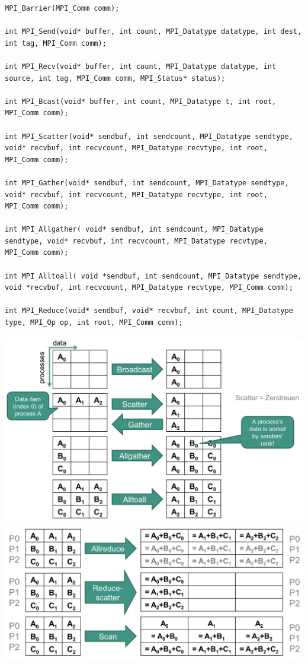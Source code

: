 \begin{verbatim}
MPI_Barrier(MPI_Comm comm);

int MPI_Send(void* buffer, int count, MPI_Datatype datatype, int dest, int tag, MPI_Comm comm);

int MPI_Recv(void* buffer, int count, MPI_Datatype datatype, int source, int tag, MPI_Comm comm, MPI_Status* status);

int MPI_Bcast(void* buffer, int count, MPI_Datatype t, int root, MPI_Comm comm);

int MPI_Scatter(void* sendbuf, int sendcount, MPI_Datatype sendtype, void* recvbuf, int recvcount, MPI_Datatype recvtype, int root, MPI_Comm comm);

int MPI_Gather(void* sendbuf, int sendcount, MPI_Datatype sendtype, void* recvbuf, int recvcount, MPI_Datatype recvtype, int root, MPI_Comm comm);

int MPI_Allgather( void* sendbuf, int sendcount, MPI_Datatype sendtype, void* recvbuf, int recvcount, MPI_Datatype recvtype, MPI_Comm comm);

int MPI_Alltoall( void *sendbuf, int sendcount, MPI_Datatype sendtype, void *recvbuf, int recvcount, MPI_Datatype recvtype, MPI_Comm comm);

int MPI_Reduce(void* sendbuf, void* recvbuf, int count, MPI_Datatype type, MPI_Op op, int root, MPI_Comm comm);
\end{verbatim}
\begin{center}
\includegraphics[width=\columnwidth]{images/MPI.png}
\includegraphics[width=\columnwidth]{images/MPI_2.png}
\end{center}
